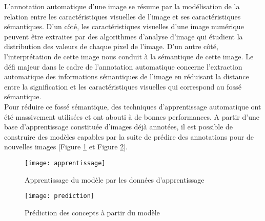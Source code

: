 \qquad L'annotation automatique d'une image se résume par la modélisation de la relation entre les caractéristiques visuelles de l'image et ses caractéristiques sémantiques. D'un côté, les caractéristiques visuelles d'une image numérique peuvent être extraites par des algorithmes d'analyse d'image qui étudient la distribution des valeurs de chaque pixel de l'image. D'un autre côté, l'interprétation de cette image nous conduit à la sémantique de cette image.  Le défi majeur dans le cadre de l'annotation automatique concerne l'extraction automatique des informations sémantiques de l'image en réduisant la distance entre la signification et les caractéristiques visuelles qui correspond au fossé sémantique.\\
\smallskip
\qquad Pour réduire ce fossé sémantique, des techniques d'apprentissage automatique ont été massivement utilisées et ont abouti à de bonnes performances. A partir d’une base d’apprentissage constituée d’images déjà annotées, il est possible de construire des modèles capables par la suite de prédire des annotations pour de nouvelles images [Figure \ref{fig:apprentissage} et Figure \ref{fig:prediction}].
\medskip
\begin{figure}[h]
	\begin{center}
		\texttt{[image: apprentissage]}
		\caption{Apprentissage du modèle par les données d'apprentissage \cite{herve2009vers}}
		\label{fig:apprentissage}
	\end{center}
\end{figure}
\smallskip
\begin{figure}[h]
	\begin{center}
		\texttt{[image: prediction]}
		\caption{Prédiction des concepts à partir du modèle \cite{herve2009vers}}
		\label{fig:prediction}
	\end{center}
\end{figure}
\smallskip

\medskip

